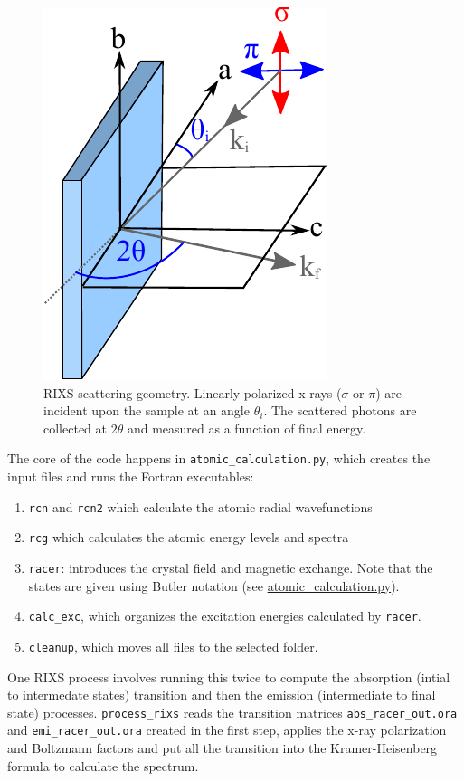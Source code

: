 \documentclass[aps,onecolumn, notitlepage, longbibliography]{revtex4-1}
\begin{document}
\begin{figure}
\includegraphics[width=1.7 in]{suppl_geometry.pdf}
\caption{RIXS scattering geometry. Linearly polarized x-rays ($\sigma$ or $\pi$) are incident upon the sample at an angle $\theta _i $. The scattered photons are collected at $2\theta$ and measured as a function of final energy.}
\label{geom}
\end{figure}

The core of the code happens in \texttt{atomic\_calculation.py}, which creates the input files and runs the Fortran executables:
\begin{enumerate}
\item \texttt{rcn} and \texttt{rcn2} which calculate the atomic radial wavefunctions
\item \texttt{rcg} which calculates the atomic energy levels and spectra
\item \texttt{racer}: introduces the crystal field and magnetic exchange. Note that the
states are given using Butler notation (see \href{https://github.com/gfabbris/multiplety/blob/master/multiplety/atomic\_calculation.py}{atomic\_calculation.py}).
\item \texttt{calc\_exc}, which organizes the excitation energies calculated by \texttt{racer}.
\item \texttt{cleanup}, which moves all files to the selected folder.
\end{enumerate}

One RIXS process involves running this twice to compute the absorption (intial to intermedate states) transition and then the emission (intermediate to final state) processes. \texttt{process\_rixs} reads the transition matrices \texttt{abs\_racer\_out.ora} and \texttt{emi\_racer\_out.ora} created in the first step, applies the x-ray polarization and Boltzmann factors and put all the transition into the Kramer-Heisenberg formula to calculate the spectrum. 


\end{document}
